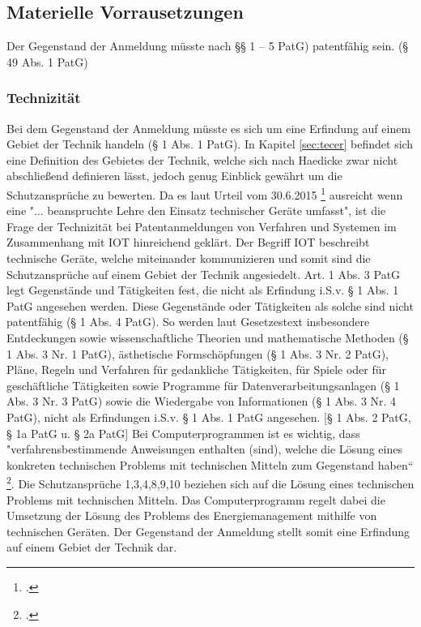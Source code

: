 \subsection{Materielle Vorrausetzungen}
Der Gegenstand der Anmeldung müsste nach §§ 1 – 5 PatG) patentfähig sein. (§ 49 Abs. 1 PatG)

\subsubsection{Technizität}
Bei dem Gegenstand der Anmeldung müsste es sich um eine Erfindung auf einem Gebiet der Technik
handeln (§ 1 Abs. 1 PatG).
In Kapitel \ref{sec:tecer} befindet sich eine Definition des Gebietes 
der Technik, welche sich nach Haedicke zwar nicht abschließend definieren
lässt, jedoch genug Einblick gewährt um die Schutzansprüche zu bewerten.
Da es laut Urteil vom 30.6.2015 \footcite{BGH3020152015} ausreicht wenn 
eine "... beanspruchte Lehre den Einsatz technischer Geräte umfasst", ist
die Frage der Technizität bei Patentanmeldungen von Verfahren und 
Systemen im Zusammenhang mit IOT hinreichend geklärt.
Der Begriff IOT beschreibt technische Geräte, welche miteinander 
kommunizieren und somit sind die Schutzansprüche auf einem Gebiet der Technik
angesiedelt.
Art. 1 Abs. 3 PatG legt Gegenstände und Tätigkeiten fest, die nicht als Erfindung i.S.v. § 1 Abs. 1 PatG
angesehen werden. Diese Gegenstände oder Tätigkeiten als solche sind nicht patentfähig (§ 1 Abs. 4
PatG). So werden laut Gesetzestext insbesondere
Entdeckungen sowie wissenschaftliche Theorien und mathematische Methoden (§ 1 Abs. 3 Nr. 1
PatG),
ästhetische Formschöpfungen (§ 1 Abs. 3 Nr. 2 PatG),
Pläne, Regeln und Verfahren für gedankliche Tätigkeiten, für Spiele oder für geschäftliche Tätigkeiten
sowie Programme für Datenverarbeitungsanlagen (§ 1 Abs. 3 Nr. 3 PatG) sowie
die Wiedergabe von Informationen (§ 1 Abs. 3 Nr. 4 PatG),
nicht als Erfindungen i.S.v. § 1 Abs. 1 PatG angesehen.
[§ 1 Abs. 2 PatG, § 1a PatG u. § 2a PatG]
Bei Computerprogrammen ist es wichtig, dass 
"verfahrensbestimmende Anweisungen enthalten (sind), welche die Lösung eines konkreten
technischen Problems mit technischen Mitteln zum Gegenstand haben“ \footcite{BGH2020092009}.
Die Schutzansprüche 1,3,4,8,9,10 beziehen sich auf die Lösung eines technischen Problems
mit technischen Mitteln. Das Computerprogramm regelt dabei die Umsetzung der 
Lösung des Problems des Energiemanagement mithilfe von technischen Geräten.
Der Gegenstand der Anmeldung stellt somit eine Erfindung auf einem Gebiet der Technik dar.



